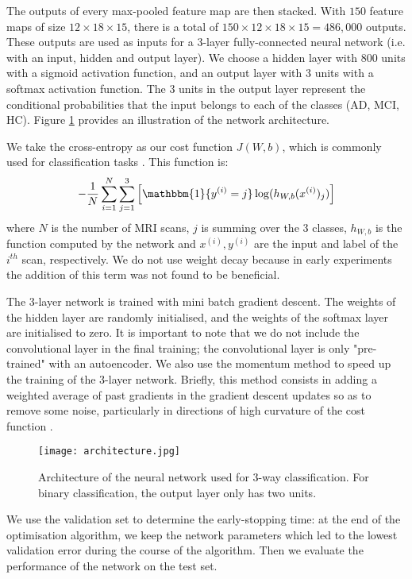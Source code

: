 \documentclass[a4paper,10pt]{article}
\begin{document}
The outputs of every max-pooled feature map are then stacked. With $150$ feature maps of size $12\times18\times15$, there is a total of $150\times12\times18\times15 = 486,000$ outputs. These outputs are used as inputs for a $3$-layer fully-connected neural network (i.e. with an input, hidden and output layer). We choose a hidden layer with $800$ units with a sigmoid activation function, and an output layer with 3 units with a softmax activation function. The 3 units in the output layer represent the conditional probabilities that the input belongs to each of the classes (AD, MCI, HC). Figure \ref{architecture} provides an illustration of the network architecture.

We take the cross-entropy as our cost function $J(W,b)$, which is commonly used for classification tasks \cite{glorot}. This function is:
\begin{equation}
-\frac{1}{N} \sum_{i=1}^{N} \sum_{j=1}^{3} \left[\mathbbm{1}\{y^{(i)} = j\} \log (h_{W,b}(x^{(i)})_{j})\right]
\end{equation}
where $N$ is the number of MRI scans, $j$ is summing over the 3 classes, $h_{W,b}$ is the function computed by the network and $x^{(i)}, y^{(i)}$ are the input and label of the $i^{th}$ scan, respectively. We do not use weight decay because in early experiments the addition of this term was not found to be beneficial.

The 3-layer network is trained with mini batch gradient descent. The weights of the hidden layer are randomly initialised, and the weights of the softmax layer are initialised to zero. It is important to note that we do not include the convolutional layer in the final training; the convolutional layer is only "pre-trained" with an autoencoder. We also use the momentum method to speed up the training of the 3-layer network. Briefly, this method consists in adding a weighted average of past gradients in the gradient descent updates so as to remove some noise, particularly in directions of high curvature of the cost function \cite{practical}. 

\begin{figure*}
	\centering
	\texttt{[image: architecture.jpg]}
	\caption{Architecture of the neural network used for 3-way classification. For binary classification, the output layer only has two units.}
\label{architecture}
\end{figure*}

We use the validation set to determine the early-stopping time: at the end of the optimisation algorithm, we keep the network parameters which led to the lowest validation error during the course of the algorithm. Then we evaluate the performance of the network on the test set.
\end{document}
